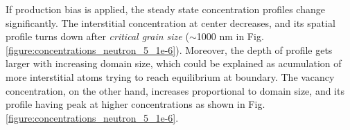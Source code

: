 \documentclass[a4paper]{article}
\begin{document}
      \newpage
       If production bias is applied, the steady state concentration profiles change significantly. The interstitial concentration at center decreases, and its spatial profile turns down after \textit{critical grain size} (${\sim}$1000 nm in Fig. \ref{figure:concentrations_neutron_5_1e-6}). Moreover, the depth of profile gets larger with increasing domain size, which could be explained as acumulation of more interstitial atoms trying to reach equilibrium at boundary. The vacancy concentration, on the other hand, increases proportional to domain size, and its profile having peak at higher concentrations as shown in Fig. \ref{figure:concentrations_neutron_5_1e-6}.\\
      \begin{figure}[h!]  %
        \centering
        \qquad

\end{figure}
\end{document}

